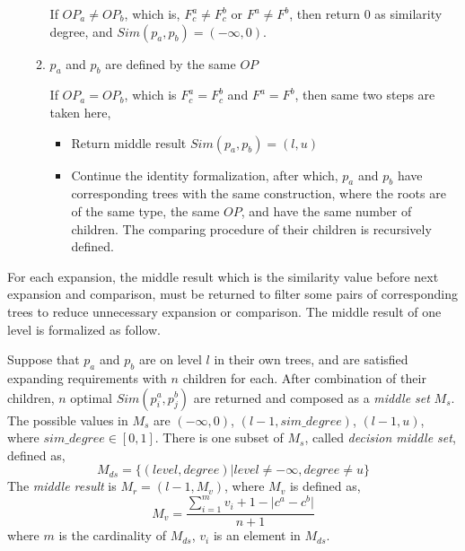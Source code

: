 \begin{itemize}
\begin{enumerate}
     If $OP_a \neq OP_b$, which is, $F_c^a \neq F_c^b$ or $F^a \neq F^b$, then return $0$ as similarity degree, and $Sim(p_a, p_b)=(-\infty,0)$. 
   
    \item $p_a$ and $p_b$ are defined by the same $OP$
   
     If $OP_a=OP_b$, which is $F_c^a=F_c^b$ and $F^a=F^b$, then
     same two steps are taken here,
    \begin{itemize}
     \item Return middle result $Sim(p_a,p_b)=(l,u)$
     \item Continue the identity formalization, after which, $p_a$ and $p_b$ have corresponding trees with the same construction, where the roots are of the same type, the same $OP$, and have the same number of children. The comparing procedure of their children is recursively defined.
\end{itemize}
   \end{enumerate}



\end{itemize}

For each expansion, the middle result which is the similarity value before next expansion and comparison, must be returned to filter some pairs of corresponding trees to reduce unnecessary expansion or comparison. The middle result of one level is formalized as follow.

Suppose that $p_a$ and $p_b$ are on level $l$ in their own trees, and are satisfied expanding requirements with $n$ children for each.
After combination of their children, $n$ optimal $Sim(p_i^a,p_j^b)$ are returned and composed as a \textit{middle set} $M_s$. The possible values in $M_s$ are $(-\infty,0)$, $(l-1,sim\_degree)$, $(l-1,u)$, where $sim\_degree \in [0,1]$. There is one subset of $M_s$, called \textit{decision middle set}, defined as,
\begin{equation}\label{eq:DecisionMiddleSet}
M_{ds}=\{(level,degree)| level \neq -\infty, degree \neq u\}
\end{equation}
The \textit{middle result} is $M_r = (l-1,M_v)$, where $M_v$ is defined as, 
\begin{equation}\label{eq:MiddleResult}
M_v=\frac{\sum_{i=1}^{m} v_i+1-\lvert c^a-c^b\rvert}{n+1}
\end{equation}
where $m$ is the cardinality of $M_{ds}$, $v_i$ is an element in $M_{ds}$. 


